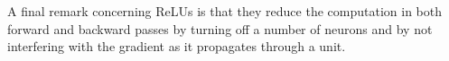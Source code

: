 \documentclass[a4paper,11pt]{article}
\begin{document}
A final remark concerning ReLUs is that they reduce the computation in both forward and backward passes by turning off a number of neurons and by not interfering with the gradient as it propagates through a unit. \\

\clearpage

%
%
%
%
%
%
%
\end{document}
